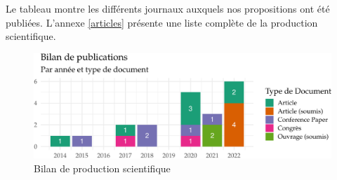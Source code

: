 \documentclass[
  12pt,
  oneside]{book}
\begin{document}
Le tableau montre les différents journaux auxquels nos propositions ont été publiées.
L'annexe \ref{articles} présente une liste complète de la production scientifique.

\begin{figure}

{\centering \includegraphics[width=0.8\linewidth]{Figures/bilan-1} 

}

\caption{Bilan de production scientifique}\label{fig:bilan}
\end{figure}
\end{document}
